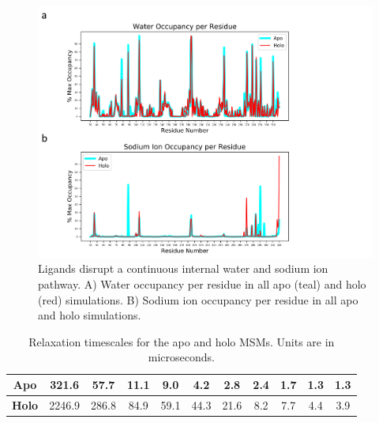 \begin{figure}[htbp]
\begin{center}
\includegraphics[width=\textwidth]{./figures/water_na_plots.png}
\caption[Ligand disruption of internal water and sodium ion pathways in CCR2]{Ligands disrupt a continuous internal water and sodium ion pathway. A) Water occupancy per residue in all apo (teal) and holo (red) simulations. B) Sodium ion occupancy per residue in all apo and holo simulations.}
\label{fig:water_na_plots}
\end{center}
\end{figure}

\begin{table}[htbp]
\begin{center}
\caption[Relaxation timescales for apo and holo CCR2 MSMs]{Relaxation timescales for the apo and holo MSMs. Units are in microseconds.}
\begin{tabular}{|c|c|c|c|c|c|c|c|c|c|c|}
\hline
\textbf{Apo} & 321.6  & 57.7  & 11.1  & 9.0  & 4.2  & 2.8  & 2.4  & 1.7  & 1.3  & 1.3 \\ \hline
\textbf{Holo} & 2246.9  & 286.8  & 84.9  & 59.1  & 44.3  & 21.6  & 8.2  & 7.7  & 4.4  & 3.9  \\ \hline
\end{tabular}

\label{table:relaxation_timescales}
\end{center}
\end{table}

